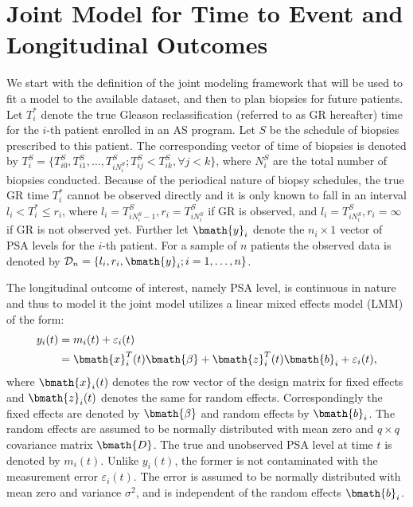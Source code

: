 
\section{Joint Model for Time to Event and Longitudinal Outcomes}
\label{web_sec : jm_framework}
We start with the definition of the joint modeling framework that will be used to fit a model to the available dataset, and then to plan biopsies for future patients. Let $T_i^*$ denote the true Gleason reclassification (referred to as GR hereafter) time for the $i$-th patient enrolled in an AS program. Let $S$ be the schedule of biopsies prescribed to this patient. The corresponding vector of time of biopsies is denoted by $T_i^S = \{T^S_{i0}, T^S_{i1}, \ldots, T^S_{i{N_i^S}}; T^S_{ij} < T^S_{ik}, \forall j<k\}$, where $N_i^S$ are the total number of biopsies conducted. Because of the periodical nature of biopsy schedules, the true GR time $T_i^*$ cannot be observed directly and it is only known to fall in an interval $l_i < T_i^* \leq r_i$, where $l_i = T^S_{i{N_i^S - 1}}, r_i = T^S_{i{N_i^S}}$ if GR is observed, and $l_i = T^S_{i{N_i^S}}, r_i=\infty$ if GR is not observed yet. Further let $\bmath{y}_i$ denote the $n_i \times 1$  vector of PSA levels for the $i$-th patient. For a sample of $n$ patients the observed data is denoted by $\mathcal{D}_n = \{l_i, r_i, \bmath{y}_i; i = 1, \ldots, n\}$.

The longitudinal outcome of interest, namely PSA level, is continuous in nature and thus to model it the joint model utilizes a linear mixed effects model (LMM) of the form:
\begin{equation*}
\begin{split}
y_i(t) &= m_i(t) + \varepsilon_i(t)\\
&=\bmath{x}_i^T(t) \bmath{\beta} + \bmath{z}_i^T(t) \bmath{b}_i + \varepsilon_i(t),
\end{split}
\end{equation*}
where $\bmath{x}_i(t)$ denotes the row vector of the design matrix for fixed effects and $\bmath{z}_i(t)$ denotes the same for random effects. Correspondingly the fixed effects are denoted by $\bmath{\beta}$ and random effects by $\bmath{b}_i$. The random effects are assumed to be normally distributed with mean zero and $q \times q$ covariance matrix $\bmath{D}$. The true and unobserved PSA level at time $t$ is denoted by $m_i(t)$. Unlike $y_i(t)$, the former is not contaminated with the measurement error $\varepsilon_i(t)$. The error is assumed to be normally distributed with mean zero and variance $\sigma^2$, and is independent of the random effects $\bmath{b}_i$.

